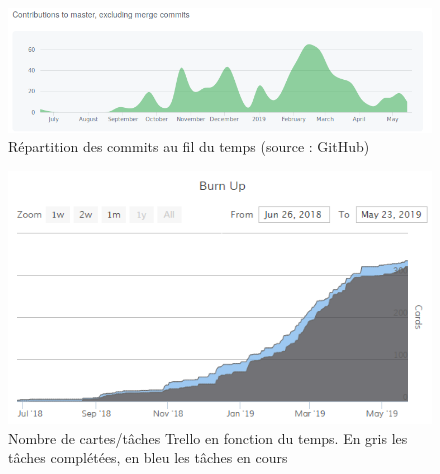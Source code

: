 \documentclass{EPL-master-thesis-covers-FR}
\begin{document}
			\begin{figure}[H]
				\includegraphics[width=\textwidth]{images/graph_git}
				\caption{Répartition des commits au fil du temps (source : GitHub)}
				\label{fig:graph_git}
			\end{figure}

			\begin{figure}[H]
				\includegraphics[width=\textwidth]{images/trello_stat}
				\caption{Nombre de cartes/tâches Trello en fonction du temps. En gris les tâches complétées, en bleu les tâches en cours}
				\label{fig:trello_stat}
			\end{figure}

	{}
	


	\appendix


		
		\label{sec:cdc}
		
\end{document}
